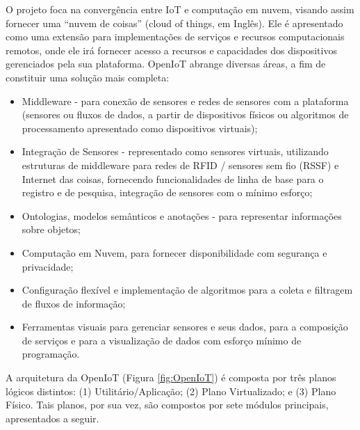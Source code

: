 O projeto foca na convergência entre IoT e computação em nuvem, visando
assim fornecer uma “nuvem de coisas” (cloud of things, em Inglês).
Ele é apresentado como uma extensão para implementações de serviços
e recursos computacionais remotos, onde ele irá fornecer acesso a
recursos e capacidades dos dispositivos gerenciados pela sua plataforma.
OpenIoT abrange diversas áreas, a fim de constituir uma solução mais
completa:
\begin{itemize}
\item Middleware - para conexão de sensores e redes de sensores com a plataforma
(sensores ou fluxos de dados, a partir de dispositivos físicos ou
algoritmos de processamento apresentado como dispositivos virtuais);
\item Integração de Sensores - representado como sensores virtuais, utilizando
estruturas de middleware para redes de RFID / sensores sem fio (RSSF)
e Internet das coisas, fornecendo funcionalidades de linha de base
para o registro e de pesquisa, integração de sensores com o mínimo
esforço;
\item Ontologias, modelos semânticos e anotações - para representar informações
sobre objetos;
\item Computação em Nuvem, para fornecer disponibilidade com segurança e
privacidade;
\item Configuração flexível e implementação de algoritmos para a coleta
e filtragem de fluxos de informação;
\item Ferramentas visuais para gerenciar sensores e seus dados, para a composição
de serviços e para a visualização de dados com esforço mínimo de programação.
\end{itemize}
A arquitetura da OpenIoT (Figura \ref{fig:OpenIoT}) é composta por
três planos lógicos distintos: (1) Utilitário/Aplicação; (2) Plano
Virtualizado; e (3) Plano Físico. Tais planos, por sua vez, são compostos
por sete módulos principais, apresentados a seguir. 

